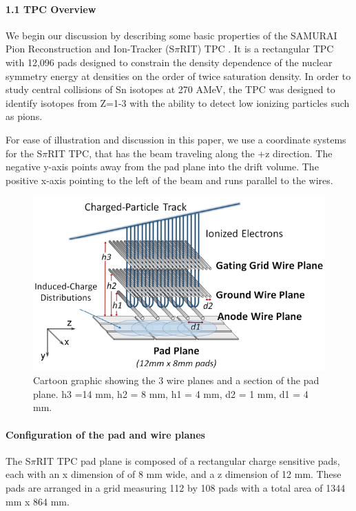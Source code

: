 \documentclass[review]{elsarticle}
\begin{document}
\paragraph{1.1 TPC Overview}
We begin our discussion by describing some basic properties of the SAMURAI Pion Reconstruction and Ion-Tracker (S$\pi$RIT) TPC \citep{shane}. It is a rectangular TPC with 12,096 pads designed to constrain the density dependence of the nuclear symmetry energy at densities on the order of twice saturation density. In order to study central collisions of Sn isotopes at 270 AMeV, the TPC was designed to identify isotopes from Z=1-3 with the ability to detect low ionizing particles such as pions. 

For ease of illustration and discussion in this paper, we use a coordinate systems for the S$\pi$RIT TPC, that has the beam traveling along the +z direction. The negative y-axis points away from the pad plane into the drift volume. The positive x-axis pointing to the left of the beam and runs parallel to the wires. 

\begin{figure}[H]
\includegraphics[width=\linewidth]{padwire}
\caption{Cartoon graphic showing the 3 wire planes and a section of the pad plane. h3 =14 mm, h2 = 8 mm, h1 = 4 mm, d2 = 1 mm, d1 = 4 mm.}
\label{fig:padwire}
\end{figure}

\paragraph{Configuration of the pad and wire planes} 
The S$\pi$RIT TPC pad plane is composed of a rectangular charge sensitive pads, each with an x dimension of of 8 mm wide, and a z dimension of 12 mm. These pads are arranged in a grid measuring 112 by 108 pads with a total area of 1344 mm x 864 mm.
\end{document}
